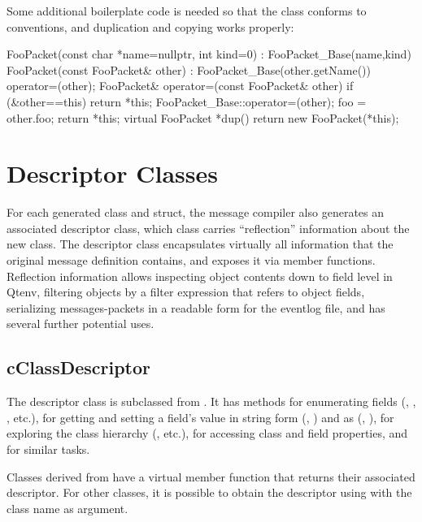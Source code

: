 Some additional boilerplate code is needed so that the class conforms
to conventions, and duplication and copying works properly:

\begin{cpp}
    FooPacket(const char *name=nullptr, int kind=0) : FooPacket_Base(name,kind) {
    }
    FooPacket(const FooPacket& other) : FooPacket_Base(other.getName()) {
        operator=(other);
    }
    FooPacket& operator=(const FooPacket& other) {
        if (&other==this) return *this;
        FooPacket_Base::operator=(other);
        foo = other.foo;
        return *this;
    }
    virtual FooPacket *dup() {
        return new FooPacket(*this);
    }
\end{cpp}


\section{Descriptor Classes}
\label{sec:msg-defs:descriptor-classes}

For each generated class and struct, the message compiler also generates an
associated descriptor class, which class carries ``reflection'' information
about the new class. The descriptor class encapsulates virtually all information
that the original message definition contains, and exposes it via member
functions. Reflection information allows inspecting object contents down to
field level in Qtenv, filtering objects by a filter expression that refers to
object fields, serializing messages-packets in a readable form for the eventlog
file, and has several further potential uses.


\subsection{cClassDescriptor}
\label{sec:msg-defs:cclassdescriptor}

The descriptor class is subclassed from . It has
methods for enumerating fields (, ,
, etc.), for getting and setting a field's value in
string form (, ) and as
 (, ), for
exploring the class hierarchy (, etc.), for
accessing class and field properties, and for similar tasks.

Classes derived from  have a virtual member function
 that returns their associated descriptor. For other
classes, it is possible to obtain the descriptor using
 with the class name as argument.

